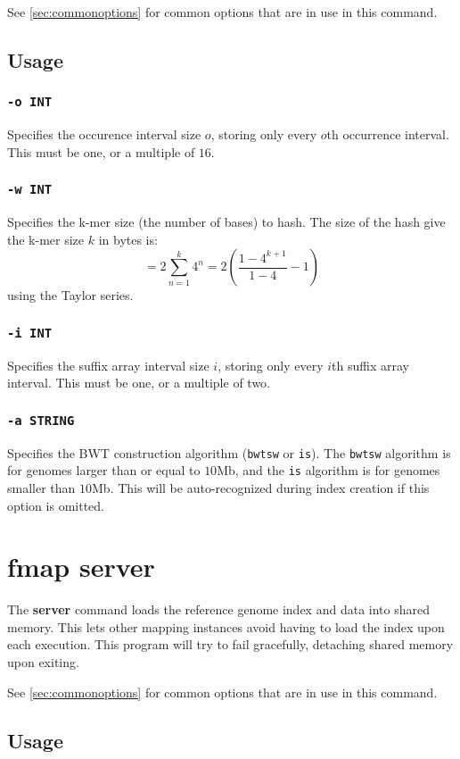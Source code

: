 \documentclass[a4paper,12pt]{book}
\newcommand{\TT}[1]{{\tt #1}} %
\newcommand{\BF}[1]{{\bf #1}} %
\begin{document}
See \autoref{sec:commonoptions} for common options that are in use in this command.

\subsection{Usage}

\subsubsection{\TT{-o INT}}
Specifies the occurence interval size $o$, storing only every $o$th occurrence interval.
This must be one, or a multiple of $16$.

\subsubsection{\TT{-w INT}}
Specifies the k-mer size (the number of bases) to hash.
The size of the hash give the k-mer size $k$ in bytes is:
\[
= 2 \sum_{n=1}^{k} 4^{n}
= 2 \left(\frac{1 - 4^{k+1}}{1-4} - 1\right)
\]
using the Taylor series.

\subsubsection{\TT{-i INT}}
Specifies the suffix array interval size $i$, storing only every $i$th suffix array interval.
This must be one, or a multiple of two.

\subsubsection{\TT{-a STRING}}
Specifies the BWT construction algorithm (\TT{bwtsw} or \TT{is}).
The \TT{bwtsw} algorithm is for genomes larger than or equal to $10$Mb, and the \TT{is} algorithm is for genomes smaller than $10$Mb.
This will be auto-recognized during index creation if this option is omitted.

\section{fmap server}
\label{sec:server}
The \BF{server} command loads the reference genome index and data into shared memory.
This lets other mapping instances avoid having to load the index upon each execution.
This program will try to fail gracefully, detaching shared memory upon exiting.

See \autoref{sec:commonoptions} for common options that are in use in this command.
\subsection{Usage}
\end{document}
